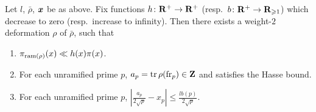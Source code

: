 \begin{theorem}\label{thm:master-Galois}
Let $l$, $\bar\rho$, ${\boldsymbol x}$ be as above. Fix functions 
$h\colon \mathbf{R}^+\to \mathbf{R}^+$ (resp.~$b\colon \mathbf{R}^+ \to \mathbf{R}_{\geqslant 1}$) which 
decrease to zero (resp.~increase to infinity). Then there exists a weight-$2$ 
deformation $\rho$ of $\bar\rho$, such that 
\begin{enumerate}
\item
$\pi_{\mathrm{ram}(\rho)}(x) \ll h(x) \pi(x)$. 

\item
For each unramified prime $p$, $a_p=\operatorname{tr}\rho(\mathrm{fr}_p)\in \mathbf{Z}$ and satisfies the 
Hasse bound. 

\item
For each unramified prime $p$, 
$\left| \frac{a_p}{2\sqrt p} - x_p\right| \leqslant \frac{l b(p)}{2\sqrt p}$. 
\end{enumerate}
\end{theorem}
